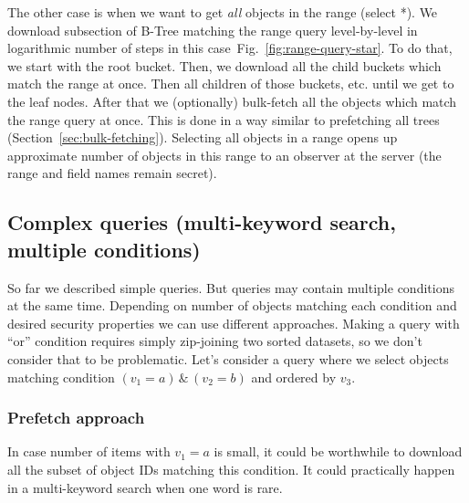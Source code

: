 \documentclass[notitlepage]{revtex4-1}
\newcommand{\figref}[1]{Fig.~\ref{#1}}
\begin{document}
The other case is when we want to get \emph{all} objects in the range (select *).
We download subsection of B-Tree matching the range query level-by-level in logarithmic number of steps in this case~\figref{fig:range-query-star}.
To do that, we start with the root bucket.
Then, we download all the child buckets which match the range at once.
Then all children of those buckets, etc. until we get to the leaf nodes.
After that we (optionally) bulk-fetch all the objects which match the range query at once.
This is done in a way similar to prefetching all trees (Section~\ref{sec:bulk-fetching}).
Selecting all objects in a range opens up approximate number of objects in this range to an observer at the server (the range and field names remain secret).

\subsection{Complex queries (multi-keyword search, multiple conditions)}

So far we described simple queries.
But queries may contain multiple conditions at the same time.
Depending on number of objects matching each condition and desired security properties we can use different approaches.
Making a query with ``or'' condition requires simply zip-joining two sorted datasets, so we don't consider that to be problematic.
Let's consider a query where we select objects matching condition $(v_1 = a) \,\&\, (v_2 = b)$ and ordered by $v_3$.

\subsubsection{Prefetch approach}
%

In case number of items with $v_1=a$ is small, it could be worthwhile to download all the subset of object IDs matching this condition.
It could practically happen in a multi-keyword search when one word is rare.
\end{document}
